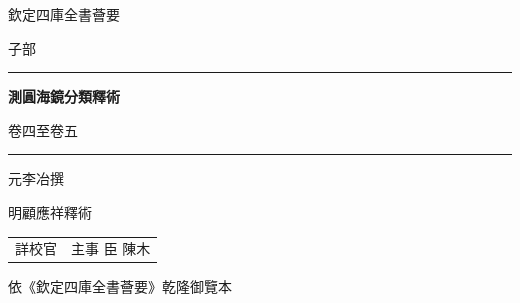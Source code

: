 \documentclass[11pt,a4paper]{article}
\begin{document}
\begin{titlepage}
\begin{center}
\vspace*{2cm}

{\fontsize{14}{18}\selectfont 欽定四庫全書薈要}

\vspace{1.5cm}

{\fontsize{12}{16}\selectfont 子部}

\vspace{2cm}

\rule{0.8\textwidth}{1.5pt}

\vspace{1cm}

{\fontsize{28}{36}\selectfont\bfseries\color{titlecolor} 測圓海鏡分類釋術}

\vspace{0.5cm}

{\fontsize{16}{22}\selectfont 卷四至卷五}

\vspace{1cm}

\rule{0.8\textwidth}{1.5pt}

\vspace{2cm}

{\fontsize{14}{18}\selectfont 元\quad 李冶\quad 撰}

\vspace{0.5cm}

{\fontsize{13}{17}\selectfont 明\quad 顧應祥\quad 釋術}

\vspace{3cm}

{\fontsize{11}{15}\selectfont\color{notecolor}
\begin{tabular}{rl}
詳校官 & 主事 臣 陳木 \\
\end{tabular}
}

\vfill

{\small 依《欽定四庫全書薈要》乾隆御覽本}

\end{center}
\end{titlepage}

\tableofcontents
\newpage

\end{document}
